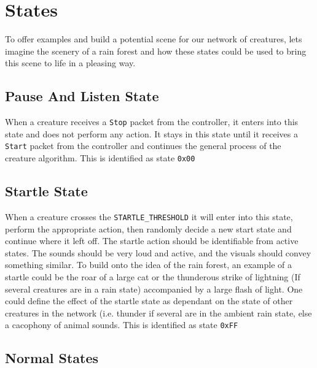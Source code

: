 \documentclass{article}
\newcommand\code{\texttt}
\newcommand\hex[1]{\texttt{0x#1}}
\begin{document}

\clearpage
\section{States}\label{sec:states}
To offer examples and build a potential scene for our network of creatures, lets imagine the scenery of a rain forest and how these states could be used to bring this scene to life in a pleasing way.

\subsection{Pause And Listen State}
When a creature receives a \code{Stop} packet from the controller, it enters into this state and does not perform any action. It stays in this state until it receives a \code{Start} packet from the controller and continues the general process of the creature algorithm.
This is identified as state \hex{00}

\subsection{Startle State}
When a creature crosses the \code{STARTLE\_THRESHOLD} it will enter into this state, perform the appropriate action, then randomly decide a new start state and continue where it left off. The startle action should be identifiable from active states. The sounds should be very loud and active, and the visuals should convey something similar. To build onto the idea of the rain forest, an example of a startle could be the roar of a large cat or the thunderous strike of lightning (If several creatures are in a rain state) accompanied by a large flash of light. One could define the effect of the startle state as dependant on the state of other creatures in the network (i.e. thunder if several are in the ambient rain state, else a cacophony of animal sounds.
This is identified as state \hex{FF}\\

\subsection{Normal States}
\end{document}
